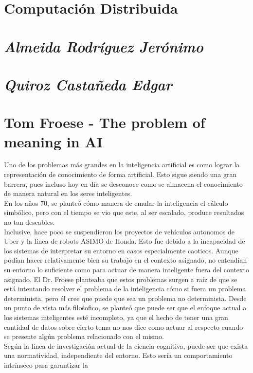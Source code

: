 \documentclass[a4paper,12pt]{article}
\begin{document}
\begin{center}
	\section*{Computación Distribuida}
	\section*{\textit{Almeida Rodríguez Jerónimo}}
	\section*{\textit{Quiroz Castañeda Edgar}}
\end{center}


\section{Tom Froese - The problem of meaning in AI}
Uno de los problemas más grandes en la inteligencia artificial es como lograr la representación de
conocimiento de forma artificial. Esto sigue siendo una gran barrera, pues incluso hoy en día se
desconoce como se almacena el conocimiento de manera natural en los seres inteligentes.\\
En los años 70, se planteó cómo manera de emular la inteligencia el cálculo simbólico, pero con el
tiempo se vio que este, al ser escalado, produce resultados no tan deseables.\\
Inclusive, hace poco se suspendieron los proyectos de vehículos autonomos de Uber y la línea de
robots ASIMO de Honda. Esto fue debido a la incapacidad de los sistemas de interpretar su entorno en
 casos especialmente caoticos. Aunque podían hacer relativamente bien su trabajo en el contexto
 asignado, no entendían su entorno lo suficiente como para actuar de manera inteligente fuera del
 contexto asignado. El Dr. Froese planteaba que estos problemas surgen a raíz de que se está
 intentando resolver el problema de la inteligencia cómo si fuera un problema determinista, pero él
 cree que puede que sea un problema no determinista.
Desde un punto de vista más filośofico, se planteó que puede ser que el enfoque actual a los
sistemas inteligentes esté incompleto, ya que el hecho de tener una gran cantidad de datos sobre
cierto tema no nos dice como actuar al respecto cuando se presente algún problema relacionado con el
 mismo.\\
Según la línea de investigación actual de la ciencia cognitiva, puede ser que exista una
normatividad, independiente del entorno. Esto sería un comportamiento intrínseco para garantizar la
\end{document}
